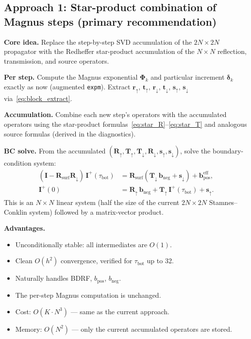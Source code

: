 \documentclass[11pt,a4paper]{article}
\newcommand{\vect}[1]{\bm{#1}}
\newcommand{\mat}[1]{\mathbf{#1}}
\newcommand{\tbot}{\tau_{\mathrm{bot}}}
\theoremstyle{definition}
\begin{document}
\subsection{Approach 1: Star-product combination of Magnus steps
(primary recommendation)}\label{sec:approach1}

\textbf{Core idea.}  Replace the step-by-step SVD accumulation of the
$2N\times 2N$ propagator with the Redheffer star-product accumulation of the
$N\times N$ reflection, transmission, and source operators.

\textbf{Per step.}  Compute the Magnus exponential $\mat{\Phi}_k$ and
particular increment $\vect{\delta}_k$ exactly as now (augmented
\texttt{expm}).  Extract $\mat{r}_\uparrow$, $\mat{t}_\uparrow$,
$\mat{r}_\downarrow$, $\mat{t}_\downarrow$, $\vect{s}_\uparrow$,
$\vect{s}_\downarrow$ via~\eqref{eq:block_extract}.

\textbf{Accumulation.}  Combine each new step's operators with the
accumulated operators using the star-product
formulas~\eqref{eq:star_R}--\eqref{eq:star_T} and analogous source
formulas (derived in the diagnostics).

\textbf{BC solve.}  From the accumulated $(\mat{R}_\uparrow, \mat{T}_\uparrow,
\mat{T}_\downarrow, \mat{R}_\downarrow, \vect{s}_\uparrow,
\vect{s}_\downarrow)$, solve the boundary-condition system:
\begin{align}
  (\mat{I}-\mat{R}_{\text{surf}}\mat{R}_\downarrow)\,\vect{I}^+(\tbot)
    &= \mat{R}_{\text{surf}}(\mat{T}_\downarrow\,\vect{b}_{\text{neg}}
       + \vect{s}_\downarrow) + \vect{b}_{\text{pos}}^{\text{eff}}, \\
  \vect{I}^+(0) &= \mat{R}_\uparrow\,\vect{b}_{\text{neg}}
                  + \mat{T}_\uparrow\,\vect{I}^+(\tbot)
                  + \vect{s}_\uparrow.
\end{align}
This is an $N\times N$ linear system (half the size of the current
$2N\times 2N$ Stamnes--Conklin system) followed by a matrix-vector product.

\textbf{Advantages.}
\begin{itemize}[nosep]
\item Unconditionally stable: all intermediates are $O(1)$.
\item Clean $O(h^2)$ convergence, verified for $\tbot$ up to 32.
\item Naturally handles BDRF, $b_{\text{pos}}$, $b_{\text{neg}}$.
\item The per-step Magnus computation is unchanged.
\item Cost: $O(K\cdot N^3)$ --- same as the current approach.
\item Memory: $O(N^2)$ --- only the current accumulated operators are stored.
\end{itemize}
\end{document}
